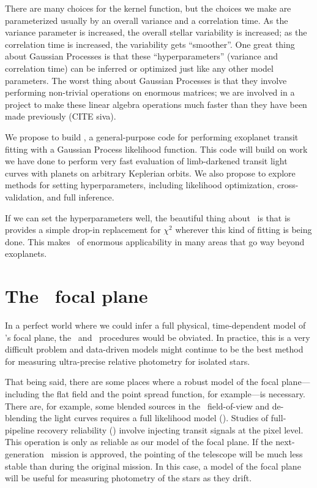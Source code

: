 \documentclass[letterpaper,12pt,preprint]{hack_aastex}
\begin{document}

There are many choices for the kernel function, but the choices we make are
parameterized usually by an overall variance and a correlation time.
As the variance parameter is increased, the overall stellar variability is
increased; as the correlation time is increased, the variability gets
``smoother''.
One great thing about Gaussian Processes is that these ``hyperparameters''
(variance and correlation time) can be inferred or optimized just like
any other model parameters.
The worst thing about Gaussian Processes is that they involve performing
non-trivial operations on enormous matrices;
we are involved in a project to make these linear algebra operations much
faster than they have been made previously (CITE siva).

We propose to build \George,
a general-purpose code for performing exoplanet transit
fitting with a Gaussian Process likelihood function.
This code will build on work we have done to perform very fast evaluation
of limb-darkened transit light curves with planets on arbitrary Keplerian
orbits.
We also propose to explore methods for setting hyperparameters,
including likelihood optimization, cross-validation, and full inference.

If we can set the hyperparameters well, the beautiful thing about \George\ is
that is provides a simple drop-in replacement for $\chi^2$ wherever this kind
of fitting is being done.
This makes \George\ of enormous applicability in many areas that go way beyond
exoplanets.

\section{The \Kepler\ focal plane}

In a perfect world where we could infer a full physical, time-dependent model
of \Kepler's focal plane, the \PLM\ and \OWL\ procedures would be obviated.
In practice, this is a very difficult problem and data-driven models might
continue to be the best method for measuring ultra-precise relative photometry
for isolated stars.

That being said, there are some places where a robust model of the focal
plane---including the flat field and the point spread function, for
example---is necessary.
There are, for example, some blended sources in the \Kepler\ field-of-view and
de-blending the light curves requires a full likelihood model (\citealt{psf}).
Studies of full-pipeline recovery reliability (\citealt{inject}) involve
injecting transit signals at the pixel level.
This operation is only as reliable as our model of the focal plane.
If the next-generation \Kepler\ mission is approved, the pointing of the
telescope will be much less stable than during the original mission.
In this case, a model of the focal plane will be useful for measuring
photometry of the stars as they drift.
\end{document}
